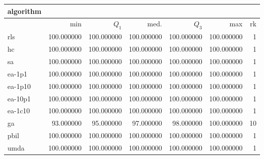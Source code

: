 \begin{tabular}{@{}l*{5}{>{{}}N{3}{0}}>{{}}N{2}{0}@{}}
\toprule
{algorithm} &  \\
\midrule
& {min} & {$Q_1$} & {med.} & {$Q_3$} & {max} & {rk}\\
\midrule
rls & {\color{blue}} 100.000000 & {\color{blue}} 100.000000 & {\color{blue}} 100.000000 & {\color{blue}} 100.000000 & {\color{blue}} 100.000000 & 1\\
hc & {\color{blue}} 100.000000 & {\color{blue}} 100.000000 & {\color{blue}} 100.000000 & {\color{blue}} 100.000000 & {\color{blue}} 100.000000 & 1\\
sa & {\color{blue}} 100.000000 & {\color{blue}} 100.000000 & {\color{blue}} 100.000000 & {\color{blue}} 100.000000 & {\color{blue}} 100.000000 & 1\\
ea-1p1 & {\color{blue}} 100.000000 & {\color{blue}} 100.000000 & {\color{blue}} 100.000000 & {\color{blue}} 100.000000 & {\color{blue}} 100.000000 & 1\\
ea-1p10 & {\color{blue}} 100.000000 & {\color{blue}} 100.000000 & {\color{blue}} 100.000000 & {\color{blue}} 100.000000 & {\color{blue}} 100.000000 & 1\\
ea-10p1 & {\color{blue}} 100.000000 & {\color{blue}} 100.000000 & {\color{blue}} 100.000000 & {\color{blue}} 100.000000 & {\color{blue}} 100.000000 & 1\\
ea-1c10 & {\color{blue}} 100.000000 & {\color{blue}} 100.000000 & {\color{blue}} 100.000000 & {\color{blue}} 100.000000 & {\color{blue}} 100.000000 & 1\\
ga & 93.000000 & 95.000000 & 97.000000 & 98.000000 & {\color{blue}} 100.000000 & 10\\
pbil & {\color{blue}} 100.000000 & {\color{blue}} 100.000000 & {\color{blue}} 100.000000 & {\color{blue}} 100.000000 & {\color{blue}} 100.000000 & 1\\
umda & {\color{blue}} 100.000000 & {\color{blue}} 100.000000 & {\color{blue}} 100.000000 & {\color{blue}} 100.000000 & {\color{blue}} 100.000000 & 1\\
\bottomrule
\end{tabular}
